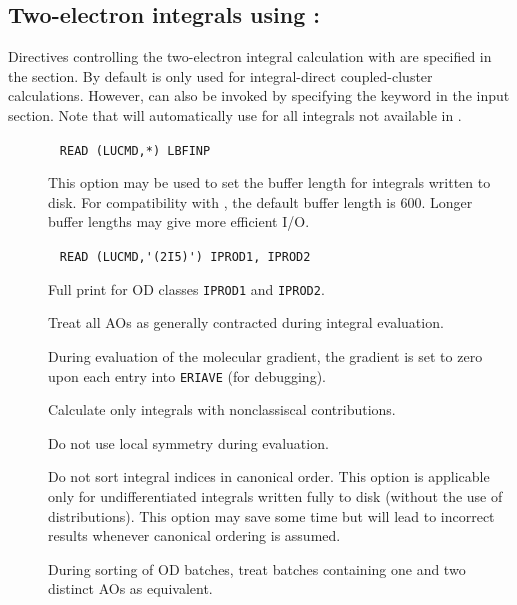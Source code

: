 \subsection{Two-electron integrals using {\eri}: }

Directives controlling the two-electron integral calculation with {\eri}
are specified in the  section.
By default {\eri} is only used for integral-direct coupled-cluster
calculations. However, {\eri} can also be invoked by specifying the
 keyword in the  input section. Note that
{\dalton} will automatically use {\twoint} for all integrals not
available in {\eri}.

\begin{description}
\item[]\verb| |\newline
\verb|READ (LUCMD,*) LBFINP|

This option may be used to set the buffer length for integrals written
to disk. For compatibility with {\twoint}, the default buffer length
is 600. Longer buffer lengths may give more efficient I/O.

\item[]\verb| |\newline
\verb|READ (LUCMD,'(2I5)') IPROD1, IPROD2|

Full print for OD classes \verb|IPROD1| and \verb|IPROD2|.

\item[] Treat all AOs as generally contracted during
integral evaluation.

\item[] During evaluation of the molecular gradient, the
gradient is set to zero upon each entry into \verb|ERIAVE| (for
debugging).

\item[] Calculate only integrals with nonclassiscal
contributions.

\item[] Do not use local symmetry during evaluation.

\item[] Do not sort integral indices in canonical
order. This option is applicable only for undifferentiated integrals
written fully to disk (without the use of distributions). This option
may save some time but will lead to incorrect results whenever
canonical ordering is assumed.

\item[] During sorting of OD batches, treat batches
containing one and two distinct AOs as equivalent.


\end{description}
